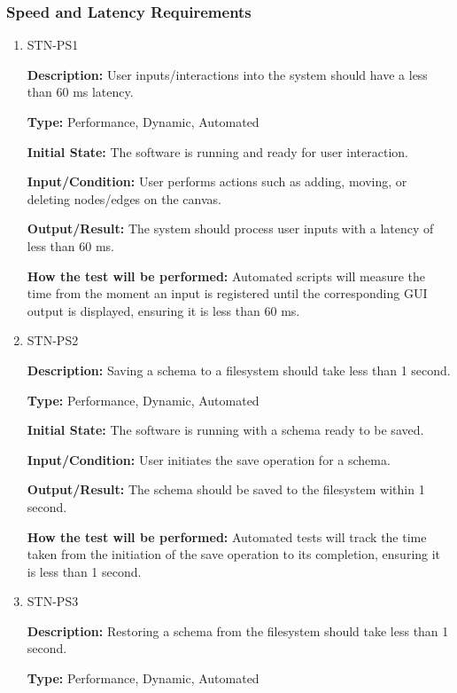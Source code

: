 \documentclass[12pt, titlepage]{article}
\begin{document}
\subsubsection{Speed and Latency Requirements}

\begin{enumerate}

\item{STN-PS1\\}

\textbf{Description:} User inputs/interactions into the system should have a less than 60 ms latency.

\textbf{Type:} Performance, Dynamic, Automated

\textbf{Initial State:} The software is running and ready for user interaction.

\textbf{Input/Condition:} User performs actions such as adding, moving, or deleting nodes/edges on the canvas.

\textbf{Output/Result:} The system should process user inputs with a latency of less than 60 ms.

\textbf{How the test will be performed:} Automated scripts will measure the time from the moment an input is registered until the corresponding GUI output is displayed, ensuring it is less than 60 ms.

\item{STN-PS2\\}

\textbf{Description:} Saving a schema to a filesystem should take less than 1 second.

\textbf{Type:} Performance, Dynamic, Automated

\textbf{Initial State:} The software is running with a schema ready to be saved.

\textbf{Input/Condition:} User initiates the save operation for a schema.

\textbf{Output/Result:} The schema should be saved to the filesystem within 1 second.

\textbf{How the test will be performed:} Automated tests will track the time taken from the initiation of the save operation to its completion, ensuring it is less than 1 second.

\item{STN-PS3\\}

\textbf{Description:} Restoring a schema from the filesystem should take less than 1 second.

\textbf{Type:} Performance, Dynamic, Automated


\end{enumerate}
\end{document}
